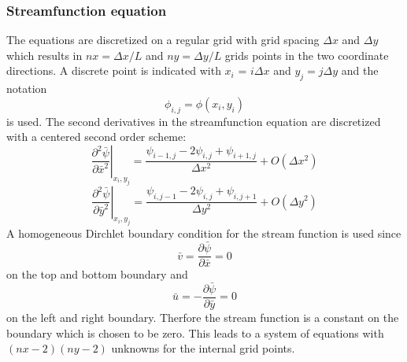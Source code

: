 \subsubsection{Streamfunction equation}
The equations are discretized on a regular grid with grid spacing $\Delta x$ and $\Delta y$ which results in $nx = \Delta x /L $ and $ny = \Delta y / L$ grids points in the two coordinate directions. A discrete point is indicated with $x_i$ = $i \Delta x$ and $y_j = j \Delta y$  and the notation
\begin{equation}
\phi_{i,j} = \phi(x_i,y_i)
\end{equation} 
is used. The second derivatives in the streamfunction equation are discretized with a centered second order scheme:
\begin{equation}
\left. \frac{\partial^2 \bar{\psi}}{\partial \bar{x}^2}\right|_{x_i,y_j} = \frac{\psi_{i-1,j} - 2 \psi_{i,j} + \psi_{i+1,j}}{\Delta x^2} + O(\Delta x^2)
\end{equation}
\begin{equation}
\left. \frac{\partial^2 \bar{\psi}}{\partial \bar{y}^2}\right|_{x_i,y_j} = \frac{\psi_{i,j-1} - 2 \psi_{i,j} + \psi_{i,j+1}}{\Delta y^2} + O(\Delta y^2)
\end{equation}
A homogeneous Dirchlet boundary condition for the stream function is used since
\begin{equation}
\bar{v} = \frac{\partial \bar{\psi}}{\partial \bar{x}} = 0
\end{equation}
on the top and bottom boundary and
\begin{equation}
\bar{u} = -\frac{\partial \bar{\psi}}{\partial \bar{y}} = 0
\end{equation}
on the left and right boundary. Therfore the stream function is a constant on the boundary which is chosen to be zero. This leads to a system of equations with $(nx-2)(ny-2)$ unknowns for the internal grid points. 
